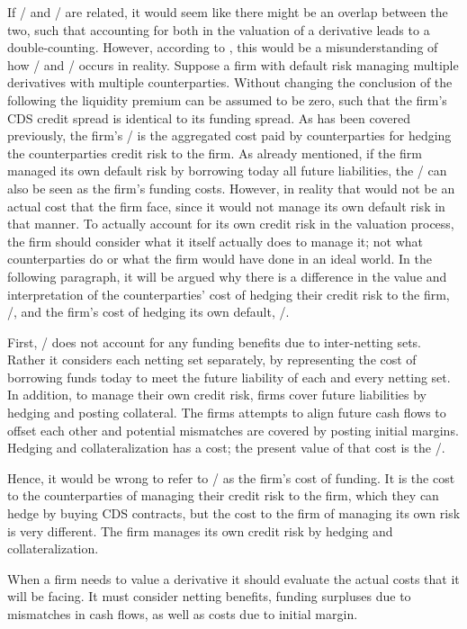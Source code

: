 \documentclass[main.tex]{subfiles}
\begin{document}
    If \DVA/ and \FVA/ are related, it would seem like there might be an overlap between the two,
    such that accounting for both in the valuation of a derivative leads to a double-counting.
    However, according to \textcite{Ruiz2015XVA}, 
    this would be a misunderstanding of how \DVA/ and \FVA/ occurs in reality.
    Suppose a firm with default risk managing multiple derivatives with multiple counterparties.
    Without changing the conclusion of the following the liquidity premium can be assumed to be zero, 
    such that the firm's CDS credit spread is identical to its funding spread.
    As has been covered previously, the firm's \DVA/ is the aggregated cost
    paid by counterparties for hedging the counterparties credit risk to the firm.
    As already mentioned, if the firm managed its own default risk by borrowing today all future liabilities,
    the \DVA/ can also be seen as the firm's funding costs.
    However, in reality that would not be an actual cost that the firm face,
    since it would not manage its own default risk in that manner.
    To actually account for its own credit risk in the valuation process,
    the firm should consider what it itself actually does to manage it;
    not what counterparties do or what the firm would have done in an ideal world.
    In the following paragraph, it will be argued why there is a difference 
    in the value and interpretation of the counterparties' cost of hedging their credit risk to the firm, \DVA/,
    and the firm's cost of hedging its own default, \FVA/.

    First, \DVA/ does not account for any funding benefits due to inter-netting sets.
    Rather it considers each netting set separately, by representing the cost 
    of borrowing funds today to meet the future liability of each and every netting set.
    In addition, to manage their own credit risk, firms cover future liabilities
    by hedging and posting collateral.
    The firms attempts to align future cash flows to offset each other
    and potential mismatches are covered by posting initial margins. 
    Hedging and collateralization has a cost; 
    the present value of that cost is the \FVA/.

    Hence, it would be wrong to refer to \DVA/ as the firm's cost of funding.
    It is the cost to the counterparties of managing their credit risk to the firm,
    which they can hedge by buying CDS contracts,
    but the cost to the firm of managing its own risk is very different. 
    The firm manages its own credit risk by hedging and collateralization.

    When a firm needs to value a derivative it should evaluate the actual costs that it will be facing.
    It must consider netting benefits, funding surpluses due to mismatches in cash flows,
    as well as costs due to initial margin.
\end{document}

